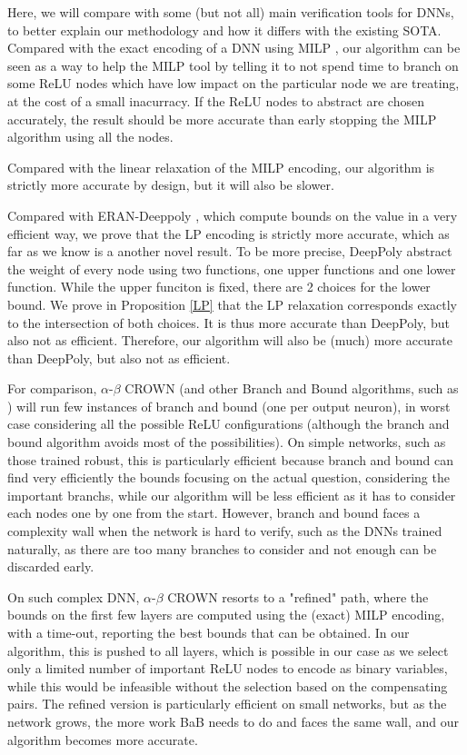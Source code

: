 \smallskip

 Here, we will compare with some (but not all) main verification tools for DNNs, to better explain our methodology and how it differs with the existing SOTA.
Compared with the exact encoding of a DNN using MILP \cite{MILP}, our algorithm can be seen as a way to help the MILP tool by telling it to not spend time to branch on some ReLU nodes which have low impact on the particular node we are treating, at the cost of a small inacurracy. If the ReLU nodes to abstract are chosen accurately, the result should be more accurate than early stopping the MILP algorithm using all the nodes.

Compared with the linear relaxation of the MILP encoding, our algorithm is strictly more accurate by design, but it will also be slower.

Compared with ERAN-Deeppoly \cite{deeppoly}, which compute bounds on the value in a very efficient way, we prove that the LP encoding is strictly more accurate, which as far as we know is a another novel result. To be more precise, DeepPoly
abstract the weight of every node using two functions, one upper functions and one lower function. While the upper funciton is fixed, there are 2 choices for the lower bound.
We prove in Proposition  \ref{LP} that the LP relaxation corresponds exactly to the intersection of both choices. It is thus more accurate than DeepPoly, but also not as efficient. Therefore, our algorithm will also be (much) more accurate than DeepPoly, but also not as efficient.

For comparison, $\alpha$-$\beta$ CROWN \cite{crown} (and other Branch and Bound algorithms, such as \cite{BaB}) will run few instances of branch and bound (one per output neuron), in worst case considering all the possible ReLU configurations (although the branch and bound algorithm avoids most of the possibilities). On simple networks, such as those trained robust, 
this is particularly efficient because branch and bound can find very efficiently the bounds
focusing on the actual question, considering the important branchs, while our algorithm will be less efficient as it has to consider each nodes one by one from the start.
However, branch and bound faces a complexity wall when the network is hard to verify, such as the DNNs trained naturally, as there are too many branches to consider and not enough can be discarded early.

On such complex DNN, $\alpha$-$\beta$ CROWN resorts to a "refined" path, where the bounds on the first few layers are computed using the (exact) MILP encoding, with a time-out, reporting the best bounds that can be obtained. In our algorithm, this is pushed to all layers, which is possible in our case as we select only a limited number of important ReLU nodes to encode as binary variables, while this would be infeasible without the selection based on the compensating pairs. The refined version is particularly efficient on small networks, but as the network grows, the more work BaB needs to do and faces the same wall, and our algorithm becomes more accurate.

